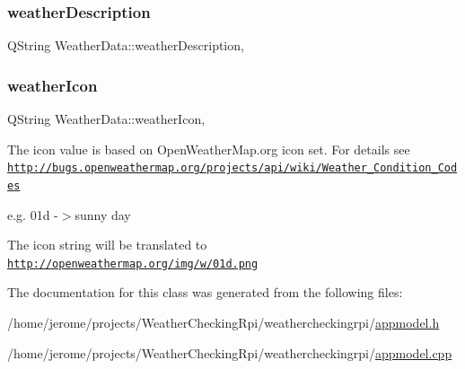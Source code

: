 \subsubsection{\texorpdfstring{weather\+Description}{weatherDescription}}
{\footnotesize\ttfamily Q\+String Weather\+Data\+::weather\+Description\hspace{0.3cm}{\ttfamily [read]}, {\ttfamily [write]}}

\mbox{\label{class_weather_data_aca04e1877e2d5bc6da0f1e9910553741}} 
\subsubsection{\texorpdfstring{weather\+Icon}{weatherIcon}}
{\footnotesize\ttfamily Q\+String Weather\+Data\+::weather\+Icon\hspace{0.3cm}{\ttfamily [read]}, {\ttfamily [write]}}

The icon value is based on Open\+Weather\+Map.\+org icon set. For details see \href{http://bugs.openweathermap.org/projects/api/wiki/Weather_Condition_Codes}{\tt http\+://bugs.\+openweathermap.\+org/projects/api/wiki/\+Weather\+\_\+\+Condition\+\_\+\+Codes}

e.\+g. 01d -\/$>$sunny day

The icon string will be translated to \href{http://openweathermap.org/img/w/01d.png}{\tt http\+://openweathermap.\+org/img/w/01d.\+png} 

The documentation for this class was generated from the following files\+:\begin{DoxyCompactItemize}
\item 
/home/jerome/projects/\+Weather\+Checking\+Rpi/weathercheckingrpi/\hyperlink{appmodel_8h}{appmodel.\+h}\item 
/home/jerome/projects/\+Weather\+Checking\+Rpi/weathercheckingrpi/\hyperlink{appmodel_8cpp}{appmodel.\+cpp}\end{DoxyCompactItemize}
